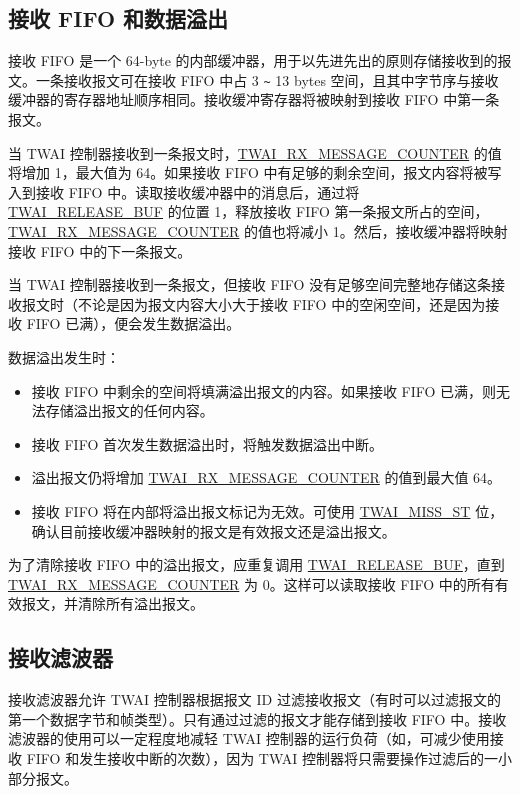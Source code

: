 \documentclass[main\_\_CN.tex]{subfiles}
\begin{document}
\subsection{接收 FIFO 和数据溢出}

接收 FIFO 是一个 64-byte 的内部缓冲器，用于以先进先出的原则存储接收到的报文。一条接收报文可在接收 FIFO 中占 3 \verb+~+ 13 bytes 空间，且其中字节序与接收缓冲器的寄存器地址顺序相同。接收缓冲寄存器将被映射到接收 FIFO 中第一条报文。

当 TWAI 控制器接收到一条报文时，\hyperref[fielddesc:TWAIRXMESSAGECOUNTER]{TWAI\_RX\_MESSAGE\_COUNTER} 的值将增加 1，最大值为 64。如果接收 FIFO 中有足够的剩余空间，报文内容将被写入到接收 FIFO 中。读取接收缓冲器中的消息后，通过将 \hyperref[fielddesc:TWAIRELEASEBUF]{TWAI\_RELEASE\_BUF} 的位置 1，释放接收 FIFO 第一条报文所占的空间，\hyperref[fielddesc:TWAIRXMESSAGECOUNTER]{TWAI\_RX\_MESSAGE\_COUNTER} 的值也将减小 1。然后，接收缓冲器将映射接收 FIFO 中的下一条报文。

当 TWAI 控制器接收到一条报文，但接收 FIFO 没有足够空间完整地存储这条接收报文时（不论是因为报文内容大小大于接收 FIFO 中的空闲空间，还是因为接收 FIFO 已满），便会发生数据溢出。

数据溢出发生时：
\begin{itemize}
    \item 接收 FIFO 中剩余的空间将填满溢出报文的内容。如果接收 FIFO 已满，则无法存储溢出报文的任何内容。
    \item 接收 FIFO 首次发生数据溢出时，将触发数据溢出中断。
    \item 溢出报文仍将增加 \hyperref[fielddesc:TWAIRXMESSAGECOUNTER]{TWAI\_RX\_MESSAGE\_COUNTER} 的值到最大值 64。
    \item 接收 FIFO 将在内部将溢出报文标记为无效。可使用 \hyperref[fielddesc:TWAIMISSST]{TWAI\_MISS\_ST} 位，确认目前接收缓冲器映射的报文是有效报文还是溢出报文。
\end{itemize}

为了清除接收 FIFO 中的溢出报文，应重复调用 \hyperref[fielddesc:TWAIRELEASEBUF]{TWAI\_RELEASE\_BUF}，直到 \hyperref[fielddesc:TWAIRXMESSAGECOUNTER]{TWAI\_RX\_MESSAGE\_COUNTER} 为 0。这样可以读取接收 FIFO 中的所有有效报文，并清除所有溢出报文。

\subsection{接收滤波器}

接收滤波器允许 TWAI 控制器根据报文 ID 过滤接收报文（有时可以过滤报文的第一个数据字节和帧类型）。只有通过过滤的报文才能存储到接收 FIFO 中。接收滤波器的使用可以一定程度地减轻 TWAI 控制器的运行负荷（如，可减少使用接收 FIFO 和发生接收中断的次数），因为 TWAI 控制器将只需要操作过滤后的一小部分报文。
\end{document}
